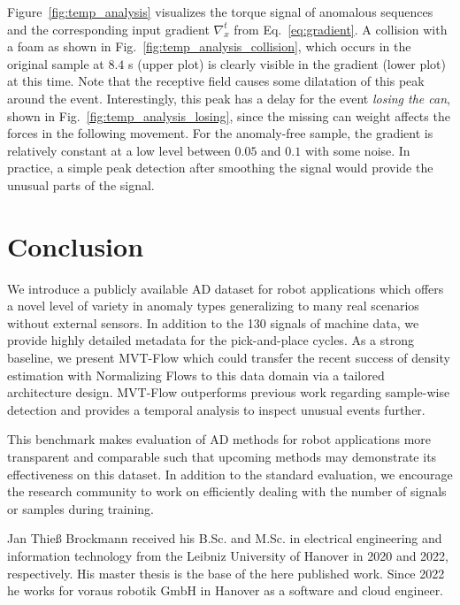\documentclass[journal]{IEEEtran}
\begin{document}
Figure~\ref{fig:temp_analysis} visualizes the torque signal of anomalous sequences and the corresponding input gradient $\nabla_x^t$ from Eq.~\ref{eq:gradient}.
A collision with a foam as shown in  Fig.~\ref{fig:temp_analysis_collision}, which occurs in the original sample {at $8.4$ s} (upper plot) is clearly visible in the gradient (lower plot) at this time.
Note that the receptive field causes some dilatation of this peak around the event.
Interestingly, this peak has a delay for the event \textit{losing the can}, shown in Fig.~\ref{fig:temp_analysis_losing}, since the missing can weight affects the forces in the following movement.
For the anomaly-free sample, the gradient is relatively constant at a low level between $0.05$ and $0.1$ with some noise.
In practice, a simple peak detection after smoothing the signal would provide the unusual parts of the signal.

\section{Conclusion}
We introduce a publicly available AD dataset for robot applications which offers a novel level of variety in anomaly types generalizing to many real scenarios without external sensors.
In addition to the 130 signals of machine data, we provide highly detailed metadata for the pick-and-place cycles.
As a strong baseline, we present MVT-Flow which could transfer the recent success of density estimation with Normalizing Flows to this data domain via a tailored architecture design.
MVT-Flow outperforms previous work regarding sample-wise detection and provides a temporal analysis to inspect unusual events further.

This benchmark makes evaluation of AD methods for robot applications more transparent and comparable such that upcoming methods may demonstrate its effectiveness on this dataset.
In addition to the standard evaluation, we encourage the research community to work on efficiently dealing with the number of signals or samples during training.

{\small


}

\newcommand\vspacebio{\vspace{-1cm}}

\vspacebio{}

\begin{IEEEbiography}{Jan Thieß Brockmann}
	 received his B.Sc. and M.Sc. in electrical engineering and information technology from the Leibniz University of Hanover in 2020 and 2022, respectively. His master thesis is the base of the here published work. Since 2022 he works for voraus robotik GmbH in Hanover as a software and cloud engineer.
\end{IEEEbiography}
\end{document}
